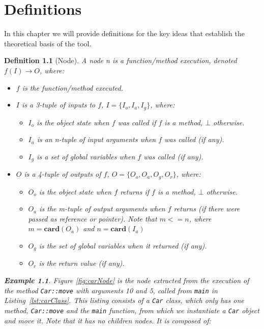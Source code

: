 \chapter{Definitions}
\label{cap:definiciones}
\newtheorem{definition}{Definition}
\newtheorem{exmp}{Example}

In this chapter we will provide definitions for the key ideas that establish the theoretical basis of the tool.

\begin{definition}[Node]
A node n is a function/method execution, denoted \(f(I) \to O\), where:
\begin{itemize}
\item \(f\) is the function/method executed.
\item \(I\) is a 3-tuple of inputs to \(f\), \(I = \{I_o, I_a, I_g\}\), where:
\begin{itemize}
\item \(I_o\) is the object state when \(f\) was called if \(f\) is a method, $\bot$ otherwise.
\item \(I_a\) is an n-tuple of input arguments when \(f\) was called (if any).
\item \(I_g\) is a set of global variables when \(f\) was called (if any).
\end{itemize}
\item \(O\) is a 4-tuple of outputs of \(f\), \(O = \{O_o, O_a, O_g, O_r\}\), where:
\begin{itemize}
\item \(O_o\) is the object state when \(f\) returns if \(f\) is a method, $\bot$ otherwise.
\item \(O_a\) is the m-tuple of output arguments when \(f\) returns (if there were passed as reference or pointer). Note that \(m <= n\), where $m=\mathbf{card}(O_a)$ and $n=\mathbf{card}(I_a)$
\item \(O_g\) is the set of global variables when it returned (if any).
\item \(O_r\) is the return value (if any).
\end{itemize}
\end{itemize}

\begin{exmp}
Figure \ref{fig:carNode} is the node extracted from the execution of the method \verb|Car::move| with arguments 10 and 5, called from \verb|main| in Listing~\ref{lst:carClass}. This listing consists of a \verb|Car| class, which only has one method, \verb|Car::move| and the \verb|main| function, from which we instantiate a \verb|Car| object and move it. Note that it has no children nodes. It is composed of:


\end{exmp}
\end{definition}
